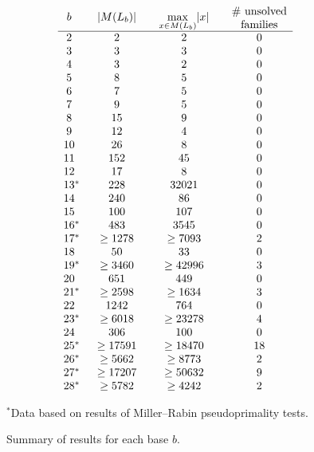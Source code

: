 \documentclass[12pt]{article}
\theoremstyle{plain}
\theoremstyle{definition}
\theoremstyle{remark}
\newcommand{\0}{\mathtt{0}}
\newcommand{\1}{\mathtt{1}}
\newcommand{\2}{\mathtt{2}}
\newcommand{\3}{\mathtt{3}}
\newcommand{\4}{\mathtt{4}}
\newcommand{\5}{\mathtt{5}}
\newcommand{\6}{\mathtt{6}}
\newcommand{\7}{\mathtt{7}}
\newcommand{\8}{\mathtt{8}}
\newcommand{\9}{\mathtt{9}}
\begin{document}
\begin{figure}\[\begin{array}{c@{\qquad}c@{\qquad}c@{\qquad}c}
b & \lvert M(L_b)\rvert & \max\limits_{x\in M(L_b)}\lvert x\rvert & \parbox{5em}{\centering\# unsolved\\families} \\ \hline
2 & 2 & 2 & 0 \\ 
3 & 3 & 3 & 0 \\ 
4 & 3 & 2 & 0 \\ 
5 & 8 & 5 & 0 \\ 
6 & 7 & 5 & 0 \\ 
7 & 9 & 5 & 0 \\ 
8 & 15 & 9 & 0 \\ 
9 & 12 & 4 & 0 \\ 
10 & 26 & 8 & 0 \\ 
11 & 152 & 45 & 0 \\ 
12 & 17 & 8 & 0 \\ 
13\mathrlap{^*} & 228 & 32021 & 0 \\ 
14 & 240 & 86 & 0 \\ 
15 & 100 & 107 & 0 \\ 
16\mathrlap{^*} & 483 & 3545 & 0 \\ 
17\mathrlap{^*} & \geq1278 & \geq7093 & 2 \\ 
18 & 50 & 33 & 0 \\ 
19\mathrlap{^*} & \geq3460 & \geq42996 & 3 \\ 
20 & 651 & 449 & 0 \\ 
21\mathrlap{^*} & \geq2598 & \geq1634 & 3 \\ 
22 & 1242 & 764 & 0 \\ 
23\mathrlap{^*} & \geq6018 & \geq23278 & 4 \\ 
24 & 306 & 100 & 0 \\ 
25\mathrlap{^*} & \geq17591 & \geq18470 & 18 \\ 
26\mathrlap{^*} & \geq5662 & \geq8773 & 2 \\ 
27\mathrlap{^*} & \geq17207 & \geq50632 & 9 \\ 
28\mathrlap{^*} & \geq5782 & \geq4242 & 2 
\end{array}\]
\begin{center}$^*$Data based on results of Miller--Rabin pseudoprimality tests.\end{center}
\caption{Summary of results for each base $b$.}
\label{resultsfig}
\end{figure}
\end{document}
